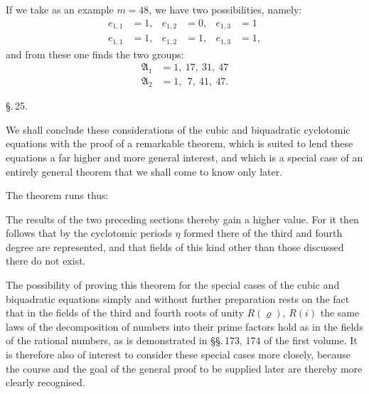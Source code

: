 If we take as an example $m = 48$, we have two possibilities, namely:
\[ \begin{aligned}
e_{1,1} &= 1, & e_{1,2} &= 0, & e_{1,3} &= 1\\
e_{1,1} &= 1, & e_{1,2} &= 1, & e_{1,3} &= 1,
\end{aligned} \]
and from these one finds the two groups:
\[ \begin{aligned}
\mathfrak{A}_1 &= 1,\ 17,\ 31,\ 47\\
\mathfrak{A}_2 &= 1,\ \ 7,\ 41,\ 47.
\end{aligned} \]

\begin{center}
\S.\,25.
\end{center}

\begin{center}
\end{center}

We shall conclude these considerations of the cubic and
biquadratic cyclotomic equations with the proof of a remarkable
theorem, which is suited to lend these equations
 a far higher and more general interest,
 and which is a special case of an entirely general theorem
that we shall come to know only later.

The theorem runs thus:


The results of the two preceding sections thereby gain
 a higher value. For it then follows that
by the cyclotomic periods $\eta$ formed there  of the third and fourth degree are represented,
and that fields of this kind other than those discussed there do not
exist.

The possibility of proving this theorem for the special cases of the
cubic and biquadratic equations simply and without
further preparation rests on the fact that in the
fields of the third and fourth roots of unity $R(\varrho)$, $R(i)$ the same
 laws of the decomposition of numbers into their prime factors
hold as in the fields of the rational numbers, as is demonstrated in
\S\S.\,173, 174 of the first volume. It is therefore
also of interest to consider these special cases more closely,
because the course and the goal of the general proof
 to be supplied later are thereby more clearly recognised.
